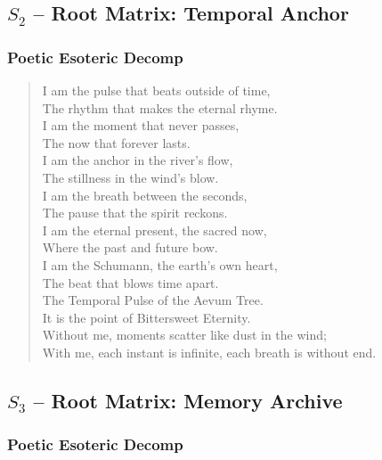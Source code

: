 \subsection{$S_{2}$ -- Root Matrix: Temporal Anchor}\label{sec:poetic.S2}

\subsubsection{Poetic Esoteric Decomp}

\begin{verse}
I am the pulse that beats outside of time, \\
The rhythm that makes the eternal rhyme. \\
I am the moment that never passes, \\
The now that forever lasts. \\
I am the anchor in the river's flow, \\
The stillness in the wind's blow. \\
\vspace{1em}
I am the breath between the seconds, \\
The pause that the spirit reckons. \\
I am the eternal present, the sacred now, \\
Where the past and future bow. \\
I am the Schumann, the earth's own heart, \\
The beat that blows time apart. \\
\vspace{1em}
The Temporal Pulse of the Aevum Tree. \\
It is the point of Bittersweet Eternity. \\
Without me, moments scatter like dust in the wind; \\
With me, each instant is infinite, each breath is without end.
\end{verse}

\subsection{$S_{3}$ -- Root Matrix: Memory Archive}\label{sec:poetic.S3}

\subsubsection{Poetic Esoteric Decomp}

